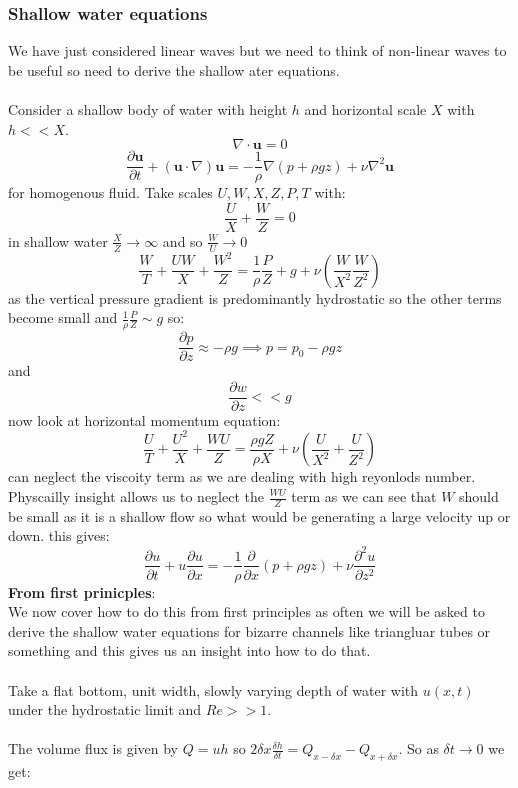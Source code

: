 \documentclass{article}
\begin{document}
\subsubsection{Shallow water equations}
We have just considered linear waves but we need to think of non-linear waves to be useful so need to derive the shallow ater equations.\\\\
Consider a shallow body of water with height $h$ and horizontal scale $X$ with $h << X$.
$$
\nabla \cdot \bm u = 0
$$
$$
 \frac{\partial \bm u}{\partial t} + ( \bm u \cdot \nabla) \bm u = - \frac{1}{\rho} \nabla ( p + \rho g z) + \nu \nabla^2 \bm u
$$
for homogenous fluid. Take scales $U, W, X, Z, P, T$ with:
$$
 \frac{U}{X} + \frac{W}{Z} = 0
$$
 in shallow water $\frac{X}{Z} \rightarrow \infty$ and so $\frac{W}{U} \rightarrow 0$
 $$
 \frac{W}{T} + \frac{UW}{X} + \frac{W^2}{Z} = \frac{1}{\rho}\frac{P}{Z} + g + \nu ( \frac{W}{X^2} \frac{W}{Z^2})
 $$
 as the vertical pressure gradient is predominantly hydrostatic so the other terms become small and $\frac{1}{\rho} \frac{P}{Z} \sim g$ so:
 $$ 
 \frac{\partial p}{\partial z} \approx - \rho g \implies p = p_0  - \rho g z
 $$
 and 
 $$
  \frac{\partial w}{\partial z} << g
 $$
 now look at horizontal momentum equation:
 $$
  \frac{U}{T} + \frac{U^2}{X} + \frac{ WU}{Z} = \frac{\rho g Z}{\rho X} + \nu ( \frac{U}{X^2} + \frac{U}{Z^2})
 $$
 can neglect the viscoity term as we are dealing with high reyonlods number. Physcailly insight allows us to neglect the $\frac{WU}{Z}$ term as we can see that $W$ should be small as it is a shallow flow so what would be generating a large velocity up or down. this gives:
 $$
  \frac{\partial u}{\partial t} + u \frac{\partial u}{\partial x} = - \frac{1}{\rho} \frac{\partial}{\partial x} ( p + \rho gz) + \nu \frac{\partial^2 u}{\partial z^2}
 $$
 \textbf{From first prinicples}:\\
 We now cover how to do this from first principles as often we will be asked to derive the shallow water equations for bizarre channels like triangluar tubes or something and this gives us an insight into how to do that.\\\\
 Take a flat bottom, unit width, slowly varying depth of water with $u(x,t)$ under the hydrostatic limit and $Re >>1$.\\\\
 The volume flux is given by $Q = uh$ so $2 \delta x \frac{\delta h}{\delta t} = Q_{x- \delta x} - Q_{x+ \delta x}$. So as $\delta t \rightarrow 0$ we get:
\end{document}
